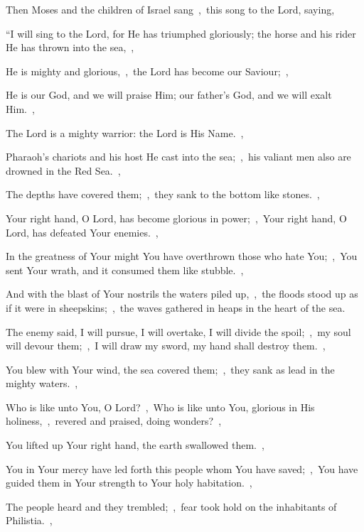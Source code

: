 \documentclass[12pt,twoside,a5paper]{article}
\begin{document}

\begin{halfparskip}
   Then Moses and the children of Israel sang~\sep\ this song to the Lord, saying,


  ``I will sing to the Lord, for He has triumphed gloriously; the horse and his rider He has thrown into the sea,~\sep

  He is mighty and glorious,~\sep\ the Lord has become our Saviour;~\sep

  He is our God, and we will praise Him; our father's God, and we will exalt Him.~\sep

  The Lord is a mighty warrior: the Lord is His Name.~\sep

  Pharaoh's chariots and his host He cast into the sea;~\sep\ his valiant men also are drowned in the Red Sea.~\sep

  The depths have covered them;~\sep\ they sank to the bottom like stones.~\sep

  Your right hand, O Lord, has become glorious in power;~\sep\ Your right hand, O Lord, has defeated Your enemies.~\sep

  In the greatness of Your might You have overthrown those who hate You;~\sep\ You sent Your wrath, and it consumed them like stubble.~\sep

  And with the blast of Your nostrils the waters piled up,~\sep\ the floods stood up as if it were in sheepskins;~\sep\ the waves gathered in heaps in the heart of the sea.

  The enemy said, I will pursue, I will overtake, I will divide the spoil;~\sep\ my soul will devour them;~\sep\ I will draw my sword, my hand shall destroy them.~\sep

  You blew with Your wind, the sea covered them;~\sep\ they sank as lead in the mighty waters.~\sep

  Who is like unto You, O Lord?~\sep\ Who is like unto You, glorious in His holiness,~\sep\ revered and praised, doing wonders?~\sep

  You lifted up Your right hand, the earth swallowed them.~\sep

  You in Your mercy have led forth this people whom You have saved;~\sep\ You have guided them in Your strength to Your holy habitation.~\sep

  The people heard and they trembled;~\sep\ fear took hold on the inhabitants of Philistia.~\sep


\end{halfparskip}
\end{document}
